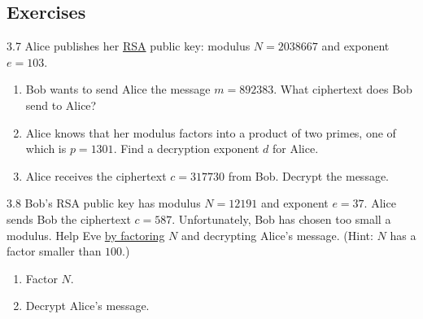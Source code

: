 \renewcommand{\theenumi}{\alph{enumi}}
\renewcommand{\labelenumi}{(\theenumi)}
\subsection{Exercises}

\begin{exercise}
    {3.7} {Alice publishes her \hyperref[sec:RSA Algorithm]{RSA} public key: modulus \(N = 2038667\) and exponent \(e = 103\).}
    \begin{enumerate}
        \item Bob wants to send Alice the message \(m = 892383\). What ciphertext does Bob send to Alice?
        \item Alice knows that her modulus factors into a product of two primes, one of which is \(p = 1301\). Find a decryption exponent \(d\) for Alice.
        \item Alice receives the ciphertext \(c = 317730\) from Bob. Decrypt the message.
    \end{enumerate}
\end{exercise}


\begin{exercise}
    {3.8} {Bob's RSA public key has modulus \(N = 12191\) and exponent \(e = 37\). Alice sends Bob the ciphertext \(c = 587\). Unfortunately, Bob has chosen too small a modulus. Help Eve \hyperref[sec:Ciphertext Attack]{by factoring} \(N\) and decrypting Alice's message. (Hint: \(N\) has a factor smaller than \(100\).)}
    \begin{enumerate}
        \item Factor \(N\).
        \item Decrypt Alice's message.
    \end{enumerate}
\end{exercise}

